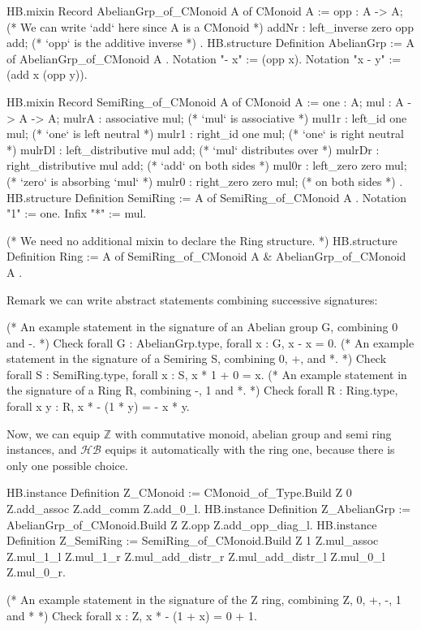 \documentclass{easychair}
\newcommand{\HB}{\ensuremath{\mathcal{HB}}}
\begin{document}
\begin{coqcode}
HB.mixin Record AbelianGrp_of_CMonoid A of CMonoid A := {
  opp   : A -> A;
  (* We can write `add` here since A is a  CMonoid   *)
  addNr : left_inverse zero opp add; (* `opp` is the additive inverse *)
}.
HB.structure Definition AbelianGrp := { A of AbelianGrp_of_CMonoid A }.
Notation "- x"   := (opp x).
Notation "x - y" := (add x (opp y)).

HB.mixin Record SemiRing_of_CMonoid A of CMonoid A := {
  one    : A;
  mul    : A -> A -> A;
  mulrA  : associative mul;  (* `mul` is associative   *)
  mul1r  : left_id one mul;  (* `one` is left neutral  *)
  mulr1  : right_id one mul; (* `one` is right neutral *)
  mulrDl : left_distributive mul add;  (* `mul` distributes over *)
  mulrDr : right_distributive mul add; (*   `add` on both sides  *)
  mul0r  : left_zero zero mul;  (* `zero` is absorbing `mul`     *)
  mulr0  : right_zero zero mul; (*   on both sides               *)
}.
HB.structure Definition SemiRing := { A of SemiRing_of_CMonoid A }.
Notation "1"  := one.
Infix    "*"  := mul.

(* We need no additional mixin to declare the Ring structure. *)
HB.structure Definition Ring := { A of SemiRing_of_CMonoid A & AbelianGrp_of_CMonoid A }.
\end{coqcode}

Remark we can write abstract statements combining successive signatures:
\begin{coqcode}
(* An example statement in the signature of an Abelian group G, combining 0 and -. *)
Check forall G : AbelianGrp.type, forall x : G, x - x = 0.
(* An example statement in the signature of a Semiring S, combining 0, +, and *.  *)
Check forall S : SemiRing.type, forall x : S, x * 1 + 0 = x.
(* An example statement in the signature of a Ring R, combining -, 1 and *.  *)
Check forall R : Ring.type, forall x y : R, x * - (1 * y) = - x * y.
\end{coqcode}

Now, we can equip $\mathbb{Z}$ with commutative monoid, abelian group and
semi ring instances, and \HB{} equips it automatically with the ring
one, because there is only one possible choice.

\begin{coqcode}
HB.instance Definition Z_CMonoid    := CMonoid_of_Type.Build Z 0%
  Z.add_assoc Z.add_comm Z.add_0_l.
HB.instance Definition Z_AbelianGrp := AbelianGrp_of_CMonoid.Build Z Z.opp Z.add_opp_diag_l.
HB.instance Definition Z_SemiRing   := SemiRing_of_CMonoid.Build Z 1%
  Z.mul_assoc Z.mul_1_l Z.mul_1_r Z.mul_add_distr_r Z.mul_add_distr_l Z.mul_0_l Z.mul_0_r.

(* An example statement in the signature of the Z ring, combining Z, 0, +, -, 1 and * *)
Check forall x : Z, x * - (1 + x) = 0 + 1.
\end{coqcode}
\end{document}
